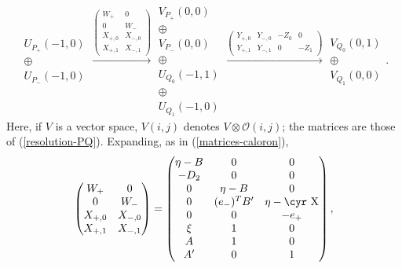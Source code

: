 \documentclass[12pt]{article}
\theoremstyle{definition}
\theoremstyle{remark}
\numberwithin{theorem}{section}
\newcommand{\Sh}{\hbox{\cyr X}}
\def\pO{{\mathcal O}}
\begin{document}
\begin{equation}   \label{agmonad} \begin{matrix}   U_{P_+}(-1,0)\\\oplus \\  U_{P_-}(-1,0) \end{matrix}\xrightarrow{\begin{pmatrix}W_+&0\\0&W_-\\X_{+,0}&X_{-,0}\\X_{+,1}&X_{-,1}\end{pmatrix}}
 \begin{matrix}  V_{P_+}(0,0)\\ \oplus \\V_{P_-}(0,0)\\ \oplus  \\  U_{Q_0}(-1,1)\\ \oplus\\    U_{Q_1} (-1,0)\end{matrix}\xrightarrow{\begin{pmatrix}Y_{+,0}&Y_{-,0}&-Z_0&0\\Y_{+,1}&Y_{-,1}&0&-Z_1\end{pmatrix}}\begin{matrix} V_{Q_0}(0,1)\\ \oplus\\  V_{Q_1}(0,0)\end{matrix} .\end{equation}
  Here, if $V$ is a vector space, $V(i,j)$ denotes $V\otimes \pO(i,j)$; the matrices are those of (\ref{resolution-PQ}).  Expanding, as in (\ref{matrices-caloron}), 
 $${\begin{pmatrix}W_+&0\\0&W_-\\X_{+,0}&X_{-,0}\\X_{+,1}&X_{-,1}\end{pmatrix}} = \begin{pmatrix} \eta-B&0&0\\-D_2&0&0\\ 0& \eta-B&0 \\ 0& (e_-)^TB'& \eta-\Sh   \\0&0&-e_+ \\ \xi &1&0\\A& 1&0 \\A'&0&1   \end{pmatrix},$$
 
\end{document}
